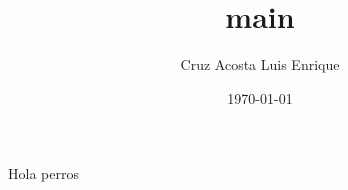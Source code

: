 \documentclass{article}
\title{main}
\author{Cruz Acosta Luis Enrique}
\date{\today}
\begin{document}
 
\maketitle
 
Hola perros
 
\end{document}
